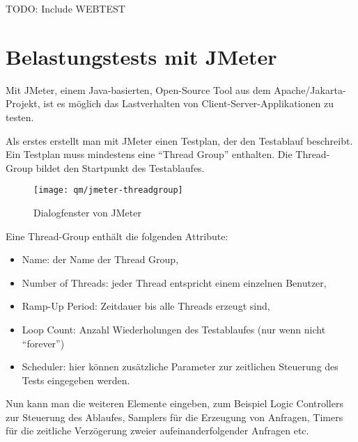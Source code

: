 %
%
\newpage
TODO: Include WEBTEST
\newpage

%
\section{Belastungstests mit JMeter}
Mit JMeter, einem Java-basierten, Open-Source Tool aus dem
Apache/Jakarta-Projekt,  ist es möglich das Lastverhalten von
Client-Server-Applikationen zu testen.

Als erstes erstellt man mit JMeter einen Testplan, der den Testablauf
beschreibt. Ein Testplan muss mindestens eine ``Thread Group'' enthalten.
Die Thread-Group bildet den Startpunkt des Testablaufes.
\begin{figure}[H]
\centering
\texttt{[image: qm/jmeter-threadgroup]}
\caption{Dialogfenster von JMeter}
\end{figure}
\newslide
Eine Thread-Group enthält die folgenden Attribute:
\begin{itemize}
\item Name: der Name der Thread Group,
\item Number of Threads: jeder Thread entspricht einem einzelnen
  Benutzer,%
\item Ramp-Up Period: Zeitdauer bis alle Threads erzeugt sind,
\item Loop Count: Anzahl Wiederholungen des Testablaufes (nur wenn nicht
  ``forever'')
\item Scheduler: hier können zusätzliche Parameter zur zeitlichen Steuerung des
  Tests eingegeben werden.
\end{itemize}
Nun kann man die weiteren Elemente eingeben, zum Beispiel Logic Controllers zur
Steuerung des Ablaufes, Samplers für die Erzeugung von Anfragen, Timers für
die zeitliche Verzögerung zweier aufeinanderfolgender Anfragen etc.

